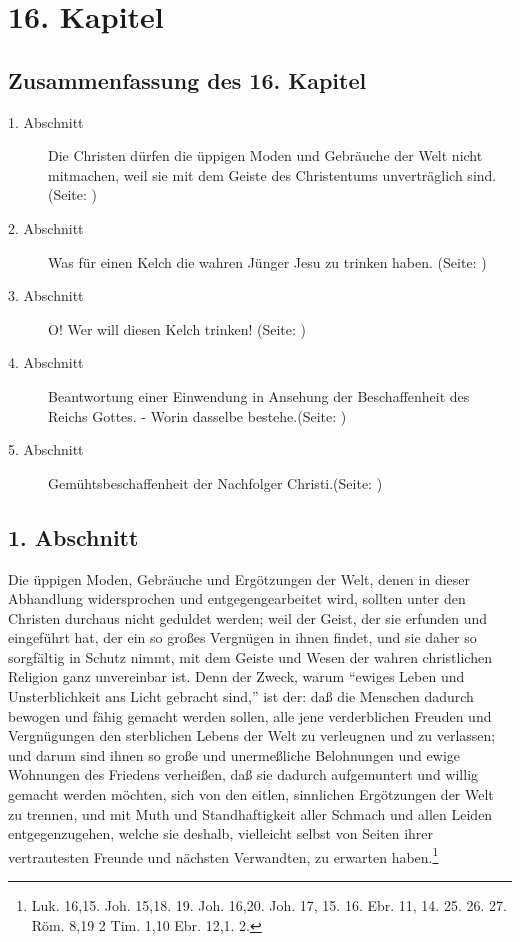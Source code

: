 

\chapter{16. Kapitel} \label{kap16}
\section{Zusammenfassung des 16. Kapitel}
\small
\begin{description}
\item[1. Abschnitt] Die Christen dürfen die üppigen Moden und Gebräuche der Welt
nicht mitmachen, weil sie mit dem Geiste des Christentums unverträglich sind. (Seite: \pageref{kap16_ab1})
\item[2. Abschnitt] Was für einen Kelch die wahren Jünger Jesu zu trinken haben. (Seite: \pageref{kap16_ab2})
\item[3. Abschnitt] O! Wer will diesen Kelch trinken! (Seite: \pageref{kap16_ab3})
\item[4. Abschnitt] Beantwortung einer Einwendung in Ansehung der Beschaffenheit
des Reichs Gottes. - Worin dasselbe bestehe.(Seite: \pageref{kap16_ab4})
\item[5. Abschnitt] Gemühtsbeschaffenheit der Nachfolger Christi.(Seite: \pageref{kap16_ab5})

\end{description}
\normalsize

\section{1. Abschnitt} \label{kap16_ab1}

Die üppigen Moden, Gebräuche und Ergötzungen der Welt, denen in dieser
Abhandlung widersprochen und entgegengearbeitet wird, sollten unter den Christen
durchaus nicht geduldet werden; weil der Geist, der sie erfunden und eingeführt
hat, der ein so großes Vergnügen in ihnen findet, und sie daher so sorgfältig in
Schutz nimmt, mit dem Geiste und Wesen der wahren christlichen Religion ganz
unvereinbar ist. Denn der Zweck, warum "`ewiges Leben und Unsterblichkeit ans
Licht gebracht sind,"' ist der: daß die Menschen dadurch bewogen und fähig
gemacht werden sollen, alle jene verderblichen Freuden und Vergnügungen den
sterblichen Lebens der Welt zu verleugnen und zu verlassen; und darum sind ihnen
so große und unermeßliche Belohnungen und ewige Wohnungen des Friedens
verheißen, daß sie dadurch aufgemuntert und willig gemacht werden möchten, sich
von den eitlen, sinnlichen Ergötzungen der Welt zu trennen, und mit Muth und
Standhaftigkeit aller Schmach und allen Leiden entgegenzugehen, welche sie
deshalb, vielleicht selbst von Seiten ihrer vertrautesten Freunde und nächsten
Verwandten, zu erwarten haben.\footnote{Luk. 16,15. Joh. 15,18. 19. Joh. 16,20.
Joh. 17, 15. 16. Ebr. 11, 14. 25. 26. 27. Röm. 8,19 2 Tim. 1,10 Ebr. 12,1. 2. }

